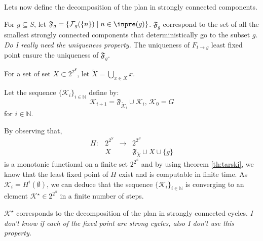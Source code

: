 Lets now define the decomposition of the plan in strongly connected components.

For $g \subseteq S$, let $\mathfrak{F}_g = \{ \mathcal{F}_g(\{n\}) \mid n \in \inpre(g) \}$.
$\mathfrak{F}_g$ correspond to the set of all the smallest strongly connected components that deterministically go to the subset $g$.
\textit{Do I really need the uniqueness property.}
The uniqueness of  $F_{t \rightarrow g}$ least fixed point ensure the uniqueness of $\mathfrak{F}_g$.

For a set of set $X \subset 2^{2^S}$, let $\tilde{X} = \bigcup_{x \in X} x$.

Let the sequence $\{\mathcal{K}_i\}_{i \in \mathbb{N}}$ define by:
\begin{equation*}
\mathcal{K}_{i+1}  = \mathfrak{F}_{\tilde{\mathcal{K}}_i} \cup \mathcal{K}_i
\textrm{, }
\mathcal{K}_0 = G
\end{equation*}
for $i \in \mathbb{N}$. 

By observing that,
\begin{equation}
\begin{array}{llll}
H : &2^{2^S} &\rightarrow &2^{2^S}\\
&X & & \mathfrak{F}_{\tilde{X}} \cup X \cup \{ g \}
\end{array}
\end{equation}
is a monotonic functional on a finite set $2^{2^S}$ and by using theorem \ref{th:tarski}, we know that the least fixed point of $H$ exist and is computable in finite time.
As $\mathcal{K}_i = H^i(\emptyset)$, we can deduce that the sequence $\{\mathcal{K}_i\}_{i \in \mathbb{N}}$ is converging to an element $\mathcal{K}^\star \in 2^{2^S}$ in a finite number of steps.

$\mathcal{K}^\star$ corresponds to the decomposition of the plan in strongly connected cycles.
\textit{I don't know if each of the fixed point are strong cycles, also I don't use this property.}

